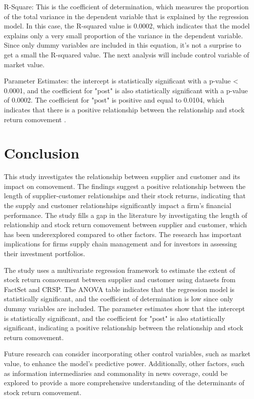 \documentclass[12pt,english]{article}
\begin{document}
R-Square: This is the coefficient of determination, which measures the proportion of the total variance in the dependent variable that is explained by the regression model. In this case, the R-squared value is 0.0002, which indicates that the model explains only a very small proportion of the variance in the dependent variable. Since only dummy variables are included in this equation, it's not a surprise to get a small the R-squared value. The next analysis will include control variable of market value.


Parameter Estimates: the intercept is statistically significant with a p-value < 0.0001, and the coefficient for "post" is also statistically significant with a p-value of 0.0002. The coefficient for "post" is positive and equal to 0.0104, which indicates that there is a positive relationship between the relationship and stock return comovement .




\section{Conclusion}\label{sec:conclusion}


This study investigates the relationship between supplier and customer and its impact on comovement. The findings suggest a positive relationship between the length of supplier-customer relationships and their stock returns, indicating that the supply and customer relationships significantly impact a firm's financial performance. The study fills a gap in the literature by investigating the length of relationship and stock return comovement between supplier and customer, which has been underexplored compared to other factors. The research has important implications for firms supply chain management and for investors in assessing their investment portfolios.

The study uses a multivariate regression framework to estimate the extent of stock return comovement between supplier and customer using datasets from FactSet and CRSP. The ANOVA table indicates that the regression model is statistically significant, and the coefficient of determination is low since only dummy variables are included. The parameter estimates show that the intercept is statistically significant, and the coefficient for "post" is also statistically significant, indicating a positive relationship between the relationship and stock return comovement.

Future research can consider incorporating other control variables, such as market value, to enhance the model's predictive power. Additionally, other factors, such as information intermediaries and commonality in news coverage, could be explored to provide a more comprehensive understanding of the determinants of stock return comovement.
\end{document}
